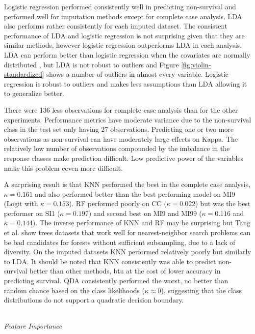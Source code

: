 \documentclass[12pt,]{article}
\begin{document}
Logistic regression performed consistently well in predicting
non-survival and performed well for imputation methods except for
complete case analysis. LDA also performs rather consistently for each
imputed dataset. The consistent performance of LDA and logistic
regression is not surprising given that they are similar methods,
however logistic regression outperforms LDA in each analysis. LDA can
perform better than logistic regression when the covariates are normally
distributed \autocite{efron_efficiency_1975}, but LDA is not robust to
outliers \autocite{hastie_elements_2009} and Figure
\ref{fig:violin-standardized} shows a number of outliers in almost every
variable. Logistic regression is robust to outliers and makes less
assumptions than LDA \autocite{hastie_elements_2009} allowing it to
generalize better.

There were 136 less observations for complete case analysis than for the
other experiments. Performance metrics have moderate variance due to the
non-survival class in the test set only having 27 observations.
Predicting one or two more observations as non-survival can have
moderately large effects on Kappa. The relatively low number of
observations compounded by the imbalance in the response classes make
prediction difficult. Low predictive power of the variables make this
problem eeven more difficult.

A surprising result is that KNN performed the best in the complete case
analysis, \(\kappa=0.161\) and also performed better than the best
performing model on MI9 (Logit with \(\kappa=0.153\)). RF performed
poorly on CC (\(\kappa=0.022\)) but was the best performer on SI1
(\(\kappa=0.197\)) and second best on MI9 and MI99 (\(\kappa=0.116\) and
\(\kappa=0.144\)). The inverse performance of KNN and RF may be
surprising but Tang et al. show \textcite{tang_when_2018} trees datasets
that work well for nearest-neighbor search problems can be bad
candidates for forests without sufficient subsampling, due to a lack of
diversity. On the imputed datasets KNN performed relatively poorly but
similarly to LDA. It should be noted that KNN consistently was able to
predict non-survival better than other methods, btu at the cost of lower
accuracy in predicting survival. QDA consistently performed the worst,
no better than random chance based on the class likelihoods
(\(\kappa \approx 0\)), suggesting that the class distributions do not
support a quadratic decision boundary.

\(~\)\\
\emph{Feature Importance}
\end{document}
